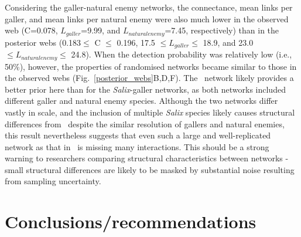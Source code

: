 \documentclass[12pt]{article}
\begin{document}
    Considering the galler-natural enemy networks, the connectance, mean links per galler, and mean links per natural enemy were also much lower in the observed web (C=0.078, $L_{galler}$=9.99, and $L_{natural enemy}$=7.45, respectively) than in the posterior webs (0.183$\leq$ C $\leq$ 0.196, 17.5 $\leq L_{galler} \leq$ 18.9, and 23.0 $\leq L_{natural enemy} \leq$ 24.8). When the detection probability was relatively low (i.e., 50\%), however, the properties of randomised networks became similar to those in the observed webs (Fig.~\ref{posterior_webs}B,D,F). The~\citet{Barbour2016} network likely provides a better prior here than for the \emph{Salix}-galler networks, as both networks included different galler and natural enemy species. Although the two networks differ vastly in scale, and the inclusion of multiple \emph{Salix} species likely causes structural differences from~\citet{Barbour2016} despite the similar resolution of gallers and natural enemies, this result nevertheless suggests that even such a large and well-replicated network as that in~\citet{Kopelke2017} is missing many interactions. This should be a strong warning to researchers comparing structural characteristics between networks - small structural differences are likely to be masked by substantial noise resulting from sampling uncertainty.




\section*{Conclusions/recommendations}
\end{document}

